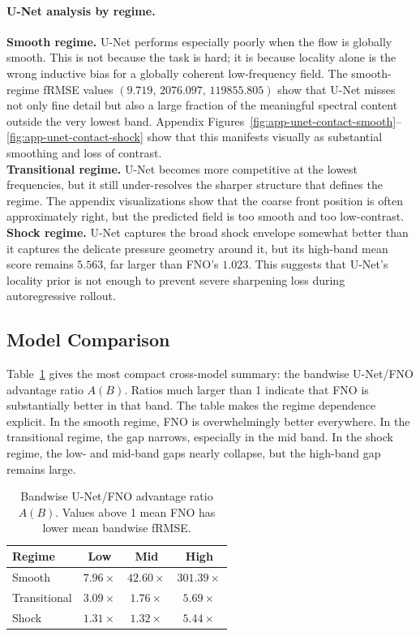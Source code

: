 \documentclass[11pt]{article}
\begin{document}
\paragraph{U-Net analysis by regime.}
\textbf{Smooth regime.} U-Net performs especially poorly when the flow is globally smooth. This is not because the task is hard; it is because locality alone is the wrong inductive bias for a globally coherent low-frequency field. The smooth-regime fRMSE values \((9.719,\,2076.097,\,119855.805)\) show that U-Net misses not only fine detail but also a large fraction of the meaningful spectral content outside the very lowest band. Appendix Figures~\ref{fig:app-unet-contact-smooth}--\ref{fig:app-unet-contact-shock} show that this manifests visually as substantial smoothing and loss of contrast. \\
\textbf{Transitional regime.} U-Net becomes more competitive at the lowest frequencies, but it still under-resolves the sharper structure that defines the regime. The appendix visualizations show that the coarse front position is often approximately right, but the predicted field is too smooth and too low-contrast. \\
\textbf{Shock regime.} U-Net captures the broad shock envelope somewhat better than it captures the delicate pressure geometry around it, but its high-band mean score remains \(5.563\), far larger than FNO's \(1.023\). This suggests that U-Net's locality prior is not enough to prevent severe sharpening loss during autoregressive rollout.

\subsection{Model Comparison}
Table~\ref{tab:ratio} gives the most compact cross-model summary: the bandwise U-Net/FNO advantage ratio \(A(B)\). Ratios much larger than 1 indicate that FNO is substantially better in that band. The table makes the regime dependence explicit. In the smooth regime, FNO is overwhelmingly better everywhere. In the transitional regime, the gap narrows, especially in the mid band. In the shock regime, the low- and mid-band gaps nearly collapse, but the high-band gap remains large.

\begin{table}[t]
\centering
\small
\begin{tabular}{@{}lccc@{}}
\toprule
\textbf{Regime} & \textbf{Low} & \textbf{Mid} & \textbf{High} \\
\midrule
Smooth & $7.96\times$ & $42.60\times$ & $301.39\times$ \\
Transitional & $3.09\times$ & $1.76\times$ & $5.69\times$ \\
Shock & $1.31\times$ & $1.32\times$ & $5.44\times$ \\
\bottomrule
\end{tabular}
\caption{Bandwise U-Net/FNO advantage ratio \(A(B)\). Values above 1 mean FNO has lower mean bandwise fRMSE.}
\label{tab:ratio}
\end{table}
\end{document}
